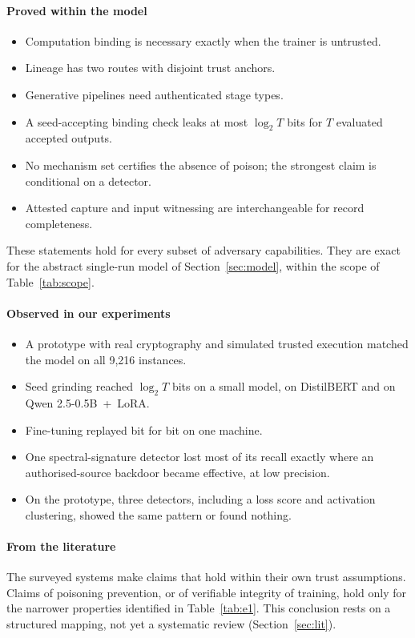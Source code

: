 \documentclass[journal,10pt]{IEEEtran}
\theoremstyle{definition}
\begin{document}
\paragraph{Proved within the model}
\begin{itemize}
\item Computation binding is necessary exactly when the trainer is untrusted.
\item Lineage has two routes with disjoint trust anchors.
\item Generative pipelines need authenticated stage types.
\item A seed-accepting binding check leaks at most $\log_2T$ bits for $T$ evaluated accepted
  outputs.
\item No mechanism set certifies the absence of poison; the strongest claim is conditional on
  a detector.
\item Attested capture and input witnessing are interchangeable for record completeness.
\end{itemize}
These statements hold for every subset of adversary capabilities. They are exact for the
abstract single-run model of Section~\ref{sec:model}, within the scope of
Table~\ref{tab:scope}.

\paragraph{Observed in our experiments}
\begin{itemize}
\item A prototype with real cryptography and simulated trusted execution matched the model
  on all 9,216 instances.
\item Seed grinding reached $\log_2T$ bits on a small model, on DistilBERT and on Qwen
  2.5-0.5B~+~LoRA.
\item Fine-tuning replayed bit for bit on one machine.
\item One spectral-signature detector lost most of its recall exactly where an
  authorised-source backdoor became effective, at low precision.
\item On the prototype, three detectors, including a loss score and activation clustering,
  showed the same pattern or found nothing.
\end{itemize}

\paragraph{From the literature}
The surveyed systems make claims that hold within their own trust assumptions. Claims of
poisoning prevention, or of verifiable integrity of training, hold only for the narrower
properties identified in Table~\ref{tab:e1}. This conclusion rests on a structured mapping,
not yet a systematic review (Section~\ref{sec:lit}).
\end{document}
